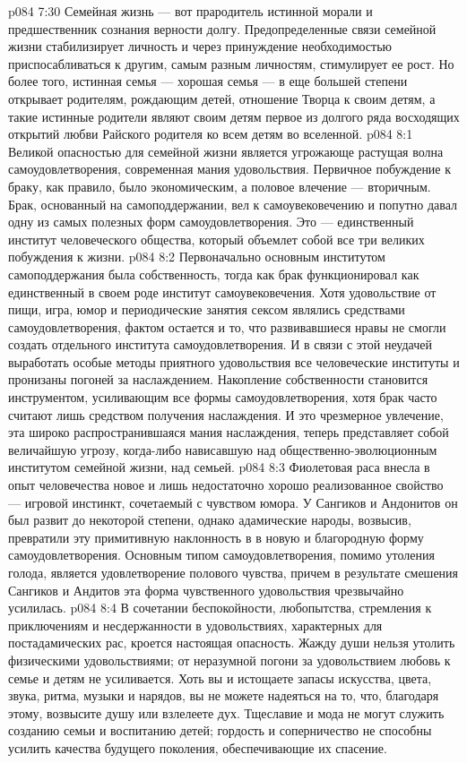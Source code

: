 \vs p084 7:30 Семейная жизнь --- вот прародитель истинной морали и предшественник сознания верности долгу. Предопределенные связи семейной жизни стабилизирует личность и через принуждение необходимостью приспосабливаться к другим, самым разным личностям, стимулирует ее рост. Но более того, истинная семья --- хорошая семья --- в еще большей степени открывает родителям, рождающим детей, отношение Творца к своим детям, а такие истинные родители являют своим детям первое из долгого ряда восходящих открытий любви Райского родителя ко всем детям во вселенной.
\vs p084 8:1 Великой опасностью для семейной жизни является угрожающе растущая волна самоудовлетворения, современная мания удовольствия. Первичное побуждение к браку, как правило, было экономическим, а половое влечение --- вторичным. Брак, основанный на самоподдержании, вел к самоувековечению и попутно давал одну из самых полезных форм самоудовлетворения. Это --- единственный институт человеческого общества, который объемлет собой все три великих побуждения к жизни.
\vs p084 8:2 Первоначально основным институтом самоподдержания была собственность, тогда как брак функционировал как единственный в своем роде институт самоувековечения. Хотя удовольствие от пищи, игра, юмор и периодические занятия сексом являлись средствами самоудовлетворения, фактом остается и то, что развивавшиеся нравы не смогли создать отдельного института самоудовлетворения. И в связи с этой неудачей выработать особые методы приятного удовольствия все человеческие институты и пронизаны погоней за наслаждением. Накопление собственности становится инструментом, усиливающим все формы самоудовлетворения, хотя брак часто считают лишь средством получения наслаждения. И это чрезмерное увлечение, эта широко распространившаяся мания наслаждения, теперь представляет собой величайшую угрозу, когда\hyp{}либо нависавшую над общественно\hyp{}эволюционным институтом семейной жизни, над семьей.
\vs p084 8:3 Фиолетовая раса внесла в опыт человечества новое и лишь недостаточно хорошо реализованное свойство --- игровой инстинкт, сочетаемый с чувством юмора. У Сангиков и Андонитов он был развит до некоторой степени, однако адамические народы, возвысив, превратили эту примитивную наклонность в  в новую и благородную форму самоудовлетворения. Основным типом самоудовлетворения, помимо утоления голода, является удовлетворение полового чувства, причем в результате смешения Сангиков и Андитов эта форма чувственного удовольствия чрезвычайно усилилась.
\vs p084 8:4 В сочетании беспокойности, любопытства, стремления к приключениям и несдержанности в удовольствиях, характерных для постадамических рас, кроется настоящая опасность. Жажду души нельзя утолить физическими удовольствиями; от неразумной погони за удовольствием любовь к семье и детям не усиливается. Хоть вы и истощаете запасы искусства, цвета, звука, ритма, музыки и нарядов, вы не можете надеяться на то, что, благодаря этому, возвысите душу или взлелеете дух. Тщеславие и мода не могут служить созданию семьи и воспитанию детей; гордость и соперничество не способны усилить качества будущего поколения, обеспечивающие их спасение.
